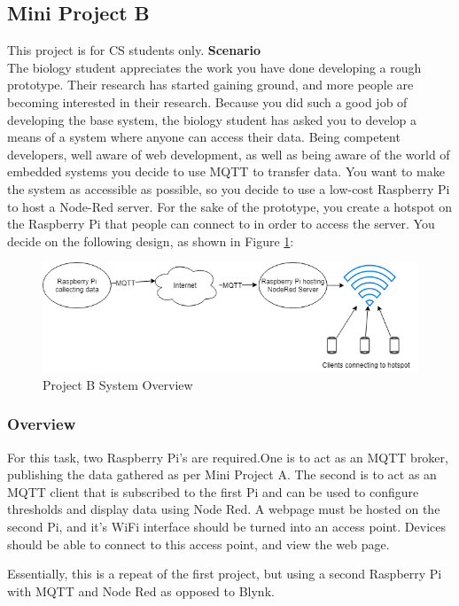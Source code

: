 \subsection{Mini Project B}
This project is for CS students only.
\textbf{Scenario}\\
The biology student appreciates the work you have done developing a rough prototype. Their research has started gaining ground, and more people are becoming interested in their research. Because you did such a good job of developing the base system, the biology student has asked you to develop a means of a system where anyone can access their data. Being competent developers, well aware of web development, as well as being aware of the world of embedded systems you decide to use MQTT to transfer data. You want to make the system as accessible as possible, so you decide to use a low-cost Raspberry Pi to host a Node-Red server. For the sake of the prototype, you create a hotspot on the Raspberry Pi that people can connect to in order to access the server. You decide on the following design, as shown in Figure \ref{fig:NodeRed}:

\begin{figure}[H]
\centering
\includegraphics[width=0.8\columnwidth]{Figures/NodeRed}
\caption{Project B System Overview}
\label{fig:NodeRed}
\end{figure}

\subsubsection{Overview}
For this task, two Raspberry Pi's are required.One is to act as an MQTT broker, publishing the data gathered as per Mini Project A. The second is to act as an MQTT client that is subscribed to the first Pi and can be used to configure thresholds and display data using Node Red. A webpage must be hosted on the second Pi, and it's WiFi interface should be turned into an access point. Devices should be able to connect to this access point, and view the web page.

Essentially, this is a repeat of the first project, but using a second Raspberry Pi with MQTT and Node Red as opposed to Blynk.

